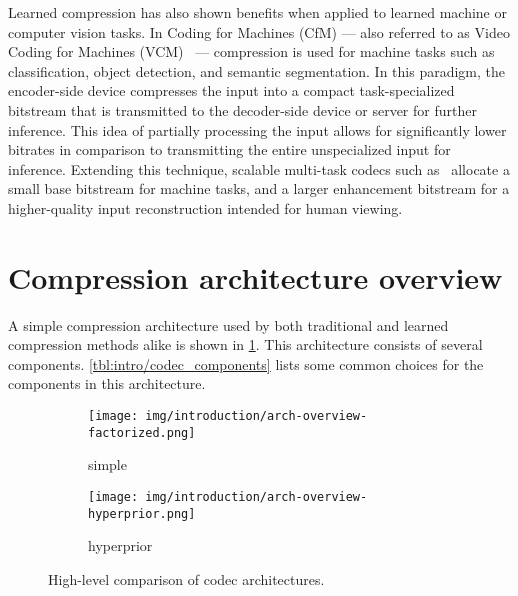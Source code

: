 Learned compression has also shown benefits when applied to learned machine or computer vision tasks.
In Coding for Machines (CfM) --- also referred to as Video Coding for Machines (VCM)~\cite{duan2020vcm} --- compression is used for machine tasks such as classification, object detection, and semantic segmentation.
In this paradigm, the encoder-side device compresses the input into a compact task-specialized bitstream that is transmitted to the decoder-side device or server for further inference.
This idea of partially processing the input allows for significantly lower bitrates in comparison to transmitting the entire unspecialized input for inference.
Extending this technique, scalable multi-task codecs such as~\cite{choi2021latentspace,choi2022sichm} allocate a small base bitstream for machine tasks, and a larger enhancement bitstream for a higher-quality input reconstruction intended for human viewing.




\section{Compression architecture overview}

A simple compression architecture used by both traditional and learned compression methods alike is shown in \cref{fig:intro/arch-comparison/factorized}.
This architecture consists of several components.
\cref{tbl:intro/codec_components} lists some common choices for the components in this architecture.

\begin{figure}[htbp]
  \centering
  \begin{subfigure}{0.8\linewidth}
    \centering
    \texttt{[image: img/introduction/arch-overview-factorized.png]}
    \caption{simple}
    \label{fig:intro/arch-comparison/factorized}
  \end{subfigure}%
  \par
  \begin{subfigure}{0.8\linewidth}
    \centering
    \texttt{[image: img/introduction/arch-overview-hyperprior.png]}
    \caption{hyperprior}
    \label{fig:intro/arch-comparison/hyperprior}
  \end{subfigure}%
  \caption[High-level comparison of codec architectures]{%
    High-level comparison of codec architectures.%
  }
  \label{fig:intro/arch-comparison}
\end{figure}


